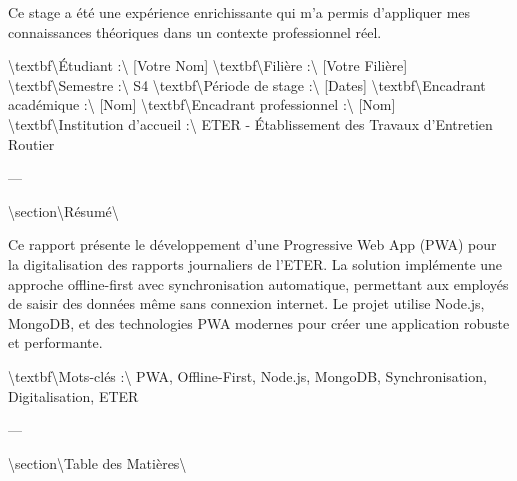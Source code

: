 \documentclass[12pt,a4paper]{report}
\begin{document}
Ce stage a été une expérience enrichissante qui m'a permis d'appliquer mes connaissances théoriques dans un contexte professionnel réel.

\newpage

\tableofcontents

\listoffigures

\listoftables

\newpage



\textbackslash{}textbf\textbackslash{}{Étudiant :\textbackslash{}} [Votre Nom]  
\textbackslash{}textbf\textbackslash{}{Filière :\textbackslash{}} [Votre Filière]  
\textbackslash{}textbf\textbackslash{}{Semestre :\textbackslash{}} S4  
\textbackslash{}textbf\textbackslash{}{Période de stage :\textbackslash{}} [Dates]  
\textbackslash{}textbf\textbackslash{}{Encadrant académique :\textbackslash{}} [Nom]  
\textbackslash{}textbf\textbackslash{}{Encadrant professionnel :\textbackslash{}} [Nom]  
\textbackslash{}textbf\textbackslash{}{Institution d'accueil :\textbackslash{}} ETER - Établissement des Travaux d'Entretien Routier

---

\textbackslash{}section\textbackslash{}{Résumé\textbackslash{}}

Ce rapport présente le développement d'une Progressive Web App (PWA) pour la digitalisation des rapports journaliers de l'ETER. La solution implémente une approche offline-first avec synchronisation automatique, permettant aux employés de saisir des données même sans connexion internet. Le projet utilise Node.js, MongoDB, et des technologies PWA modernes pour créer une application robuste et performante.

\textbackslash{}textbf\textbackslash{}{Mots-clés :\textbackslash{}} PWA, Offline-First, Node.js, MongoDB, Synchronisation, Digitalisation, ETER

---

\textbackslash{}section\textbackslash{}{Table des Matières\textbackslash{}}
\end{document}
